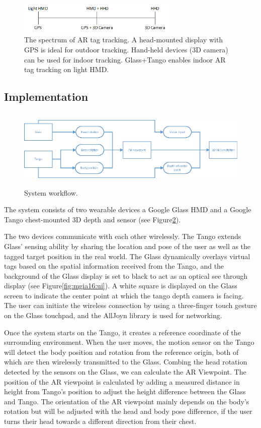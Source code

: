 \begin{figure}[ht]
  \centering
  \includegraphics[width=3.0in]{images/mgia16/tango_paper_continuum}
  \caption{The spectrum of AR tag tracking. A head-mounted display with GPS is ideal for outdoor tracking. Hand-held devices (3D camera) can be used for indoor tracking. Glass+Tango enables indoor AR tag tracking on light HMD.}
  \label{fig:mgia16:spectrum}
\end{figure}

\subsection{Implementation}


\begin{figure}[t]
  \centering
  \includegraphics[height=1.5in]{images/mgia16/workflow_diagram}
  \caption{System workflow.}
  \label{framework}
\end{figure}


The system consists of two wearable devices a Google Glass HMD and a Google Tango chest-mounted 3D depth and sensor (see Figure\ref{framework}).

The two devices communicate with each other wirelessly. The Tango extends Glass' sensing ability by sharing the location and pose of the user as well as the tagged target position in the real world. The Glass dynamically overlays virtual tags based on the spatial information received from the Tango, and the background of the Glass display is set to black to act as an optical see through display (see Figure\ref{fig:mgia16:ui}). A white square is displayed on the Glass screen to indicate the center point at which the tango depth camera is facing. The user can initiate the wireless connection by using a three-finger touch gesture on the Glass touchpad, and the AllJoyn library  is used for networking.

Once the system starts on the Tango, it creates a reference coordinate of the surrounding environment. When the user moves, the motion sensor on the Tango will detect the body  position and rotation from the reference origin, both of which are then wirelessly transmitted to the Glass. Combing the head rotation detected by the sensors on the Glass, we can calculate the AR Viewpoint. The position of the AR viewpoint is calculated by adding a measured distance in height from Tango's position to adjust the height difference between the Glass and Tango. The orientation of the AR viewpoint mainly depends on the body's rotation but will be adjusted with the head and body pose difference, if the user turns their head towards a different direction from their chest. 

